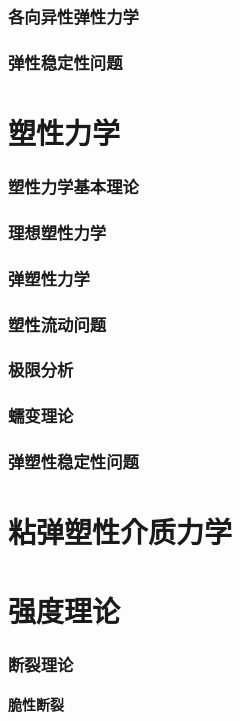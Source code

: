 \documentclass[UTF8]{../../06-Physics}
\begin{document}
    \subsection{各向异性弹性力学}
    \subsection{弹性稳定性问题}

\chapter{塑性力学}
    \subsection{塑性力学基本理论}
    \subsection{理想塑性力学}
    \subsection{弹塑性力学}
    \subsection{塑性流动问题}
    \subsection{极限分析}
    \subsection{蠕变理论}
    \subsection{弹塑性稳定性问题}

\chapter{粘弹塑性介质力学}
\chapter{强度理论}
    \subsection{断裂理论}
        \subsubsection{脆性断裂}
\end{document}
